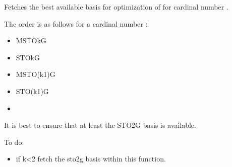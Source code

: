 \documentclass[letterpaper,10pt,english]{sphinxmanual}
\begin{document}
\begin{fulllineitems}
\begin{quote}
\begin{description}
\begin{itemize}
\end{itemize}

\end{description}\end{quote}

\begin{sphinxVerbatim}[commandchars=\\\{\}]
  
\end{sphinxVerbatim}

\end{fulllineitems}


\begin{fulllineitems}
\label{\detokenize{api:MSTOOpt.FetchBestMol}}
\pysigstartsignatures
\pysiglinewithargsret
{}
{\sphinxparamcomma {}\sphinxparamcomma {}}
{}
\pysigstopsignatures
\sphinxAtStartPar
Fetches the best available basis for optimization of  for cardinal number .

\sphinxAtStartPar
The order is as follows for a cardinal number :
\begin{itemize}
\item {} 
\sphinxAtStartPar
MSTO\sphinxhyphen{}kG

\item {} 
\sphinxAtStartPar
STO\sphinxhyphen{}kG

\item {} 
\sphinxAtStartPar
MSTO\sphinxhyphen{}(k\sphinxhyphen{}1)G

\item {} 
\sphinxAtStartPar
STO\sphinxhyphen{}(k\sphinxhyphen{}1)G

\item {} 
\end{itemize}

\sphinxAtStartPar
It is best to ensure that at least the STO\sphinxhyphen{}2G basis is available.

\sphinxAtStartPar
To do:
\begin{itemize}
\item {} 
\sphinxAtStartPar
if k\textless{}2 fetch the sto\sphinxhyphen{}2g basis within this function.

\end{itemize}

\end{fulllineitems}
\end{document}
